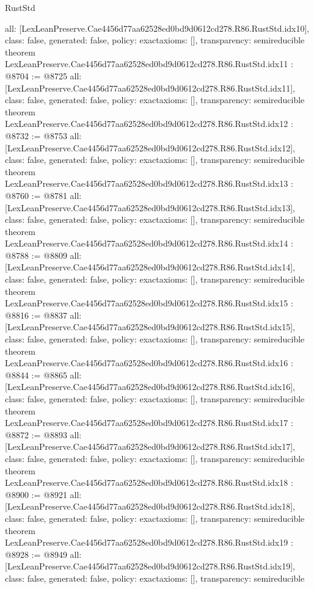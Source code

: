 \begin{lexlean}{RustStd}
\begin{coremodule}
{  all: [LexLeanPreserve.Cae4456d77aa62528ed0bd9d0612cd278.R86.RustStd.idx10],
  class: false,
  generated: false,
  policy: exact{axioms: []},
  transparency: semireducible
}
theorem LexLeanPreserve.Cae4456d77aa62528ed0bd9d0612cd278.R86.RustStd.idx11 : @8704 := @8725 {
  all: [LexLeanPreserve.Cae4456d77aa62528ed0bd9d0612cd278.R86.RustStd.idx11],
  class: false,
  generated: false,
  policy: exact{axioms: []},
  transparency: semireducible
}
theorem LexLeanPreserve.Cae4456d77aa62528ed0bd9d0612cd278.R86.RustStd.idx12 : @8732 := @8753 {
  all: [LexLeanPreserve.Cae4456d77aa62528ed0bd9d0612cd278.R86.RustStd.idx12],
  class: false,
  generated: false,
  policy: exact{axioms: []},
  transparency: semireducible
}
theorem LexLeanPreserve.Cae4456d77aa62528ed0bd9d0612cd278.R86.RustStd.idx13 : @8760 := @8781 {
  all: [LexLeanPreserve.Cae4456d77aa62528ed0bd9d0612cd278.R86.RustStd.idx13],
  class: false,
  generated: false,
  policy: exact{axioms: []},
  transparency: semireducible
}
theorem LexLeanPreserve.Cae4456d77aa62528ed0bd9d0612cd278.R86.RustStd.idx14 : @8788 := @8809 {
  all: [LexLeanPreserve.Cae4456d77aa62528ed0bd9d0612cd278.R86.RustStd.idx14],
  class: false,
  generated: false,
  policy: exact{axioms: []},
  transparency: semireducible
}
theorem LexLeanPreserve.Cae4456d77aa62528ed0bd9d0612cd278.R86.RustStd.idx15 : @8816 := @8837 {
  all: [LexLeanPreserve.Cae4456d77aa62528ed0bd9d0612cd278.R86.RustStd.idx15],
  class: false,
  generated: false,
  policy: exact{axioms: []},
  transparency: semireducible
}
theorem LexLeanPreserve.Cae4456d77aa62528ed0bd9d0612cd278.R86.RustStd.idx16 : @8844 := @8865 {
  all: [LexLeanPreserve.Cae4456d77aa62528ed0bd9d0612cd278.R86.RustStd.idx16],
  class: false,
  generated: false,
  policy: exact{axioms: []},
  transparency: semireducible
}
theorem LexLeanPreserve.Cae4456d77aa62528ed0bd9d0612cd278.R86.RustStd.idx17 : @8872 := @8893 {
  all: [LexLeanPreserve.Cae4456d77aa62528ed0bd9d0612cd278.R86.RustStd.idx17],
  class: false,
  generated: false,
  policy: exact{axioms: []},
  transparency: semireducible
}
theorem LexLeanPreserve.Cae4456d77aa62528ed0bd9d0612cd278.R86.RustStd.idx18 : @8900 := @8921 {
  all: [LexLeanPreserve.Cae4456d77aa62528ed0bd9d0612cd278.R86.RustStd.idx18],
  class: false,
  generated: false,
  policy: exact{axioms: []},
  transparency: semireducible
}
theorem LexLeanPreserve.Cae4456d77aa62528ed0bd9d0612cd278.R86.RustStd.idx19 : @8928 := @8949 {
  all: [LexLeanPreserve.Cae4456d77aa62528ed0bd9d0612cd278.R86.RustStd.idx19],
  class: false,
  generated: false,
  policy: exact{axioms: []},
  transparency: semireducible
}
\end{coremodule}
\end{lexlean}
